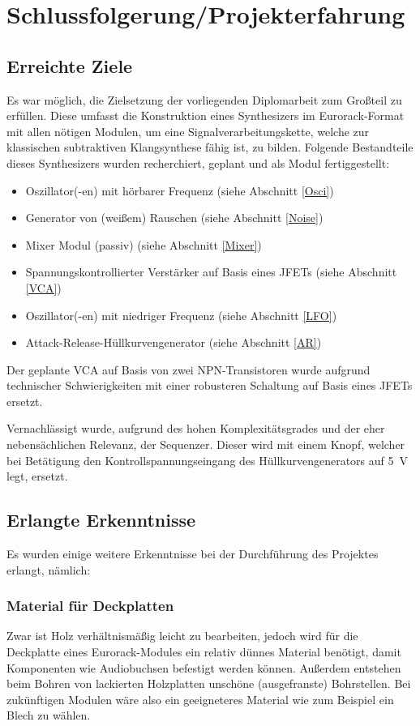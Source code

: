 \chapter{Schlussfolgerung/Projekterfahrung}

\section{Erreichte Ziele \label{goals}}
\label{sec:org9143928}
Es war möglich, die Zielsetzung der vorliegenden Diplomarbeit zum Großteil zu erfüllen. Diese umfasst die Konstruktion eines Synthesizers im Eurorack-Format mit allen nötigen Modulen, um eine Signalverarbeitungskette, welche zur klassischen subtraktiven Klangsynthese fähig ist, zu bilden. Folgende Bestandteile dieses Synthesizers wurden recherchiert, geplant und als Modul fertiggestellt:

\begin{itemize}
\item Oszillator(-en) mit hörbarer Frequenz (siehe Abschnitt \ref{Osci})
\item Generator von (weißem) Rauschen (siehe Abschnitt \ref{Noise})
\item Mixer Modul (passiv) (siehe Abschnitt \ref{Mixer})
\item Spannungskontrollierter Verstärker auf Basis eines JFETs (siehe Abschnitt \ref{VCA})
\item Oszillator(-en) mit niedriger Frequenz (siehe Abschnitt \ref{LFO})
\item Attack-Release-Hüllkurvengenerator (siehe Abschnitt \ref{AR})
\end{itemize}

Der geplante \ac{VCA} auf Basis von zwei NPN-Transistoren wurde aufgrund technischer Schwierigkeiten mit einer robusteren Schaltung auf Basis eines JFETs ersetzt.

Vernachlässigt wurde, aufgrund des hohen Komplexitätsgrades und der eher nebensächlichen Relevanz, der Sequenzer. Dieser wird mit einem Knopf, welcher bei Betätigung den Kontrollspannungseingang des Hüllkurvengenerators auf \SI{5}{\volt} legt, ersetzt.

\section{Erlangte Erkenntnisse}
\label{sec:org0161ff4}
Es wurden einige weitere Erkenntnisse bei der Durchführung des Projektes erlangt, nämlich:

\subsection{Material für Deckplatten}
\label{sec:org8e2ca9e}
Zwar ist Holz verhältnismäßig leicht zu bearbeiten, jedoch wird für die Deckplatte eines Eurorack-Modules ein relativ dünnes Material benötigt, damit Komponenten wie Audiobuchsen befestigt werden können. Außerdem entstehen beim Bohren von lackierten Holzplatten unschöne (ausgefranste) Bohrstellen. Bei zukünftigen Modulen wäre also ein geeigneteres Material wie zum Beispiel ein Blech zu wählen.

